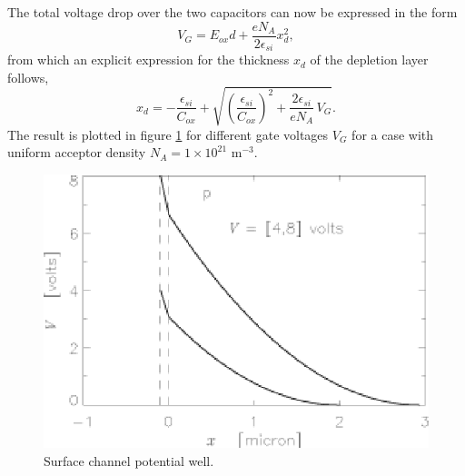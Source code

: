 \documentclass{article}
\begin{document}
The total voltage drop over the two capacitors can now be expressed in
the form
\begin{equation}
  V_G = E_{ox}d + \frac{e N_A}{2\epsilon_{si}} x_d^2,
  \label{CCD.surVG}
\end{equation}
from which an explicit expression for the thickness $x_d$ of the
depletion layer follows,
\begin{equation}
  x_d = -\frac{\epsilon_{si}}{C_{ox}} +
  \sqrt{\left(\frac{\epsilon_{si}}{C_{ox}}\right)^2
       +\frac{2\epsilon_{si}}{eN_A}\, V_G}.
  \label{CCD.xd}
\end{equation}
The result is plotted in figure \ref{CCD.figsurchan} for different
gate voltages $V_G$ for a case with uniform acceptor density $N_A =
1\times10^{21}$ m$^{-3}$.

\begin{figure}[h]
  \centering
	\includegraphics{CCD_surchan.eps}
  \caption{Surface channel potential well.}
  \label{CCD.figsurchan}
\end{figure}
\end{document}
